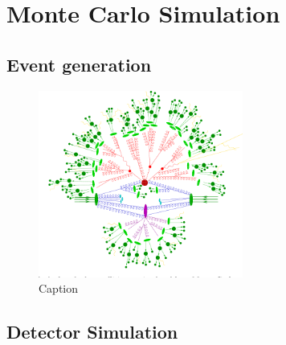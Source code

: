 
\section{Monte Carlo Simulation}
\label{sec:cmsexperiment:simulation}


\subsection{Event generation}

\begin{figure}[ht]
    \centering
    \includegraphics[width=0.6\textwidth]{chapters/CMSExperiment/sectionMCSimulation/figures/ps.png}
    \caption{Caption}
    \label{fig:cmsexperiment:simulation:ps}
\end{figure}


\subsection{Detector Simulation}